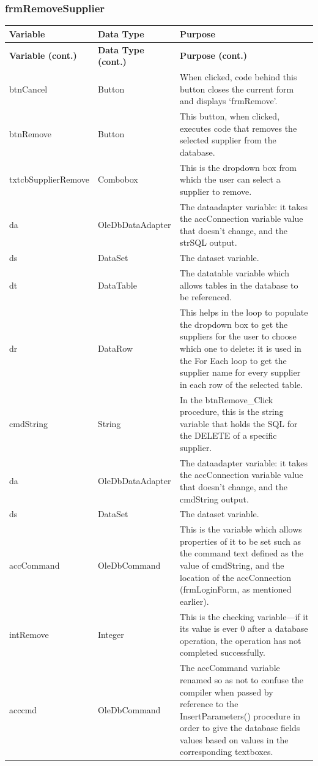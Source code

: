 	\subsubsection{frmRemoveSupplier}
	\begin{longtable}{| p{4cm} | p{3cm} | p{10cm} |}
		\hline
		\textbf{Variable} & \textbf{Data Type} & \textbf{Purpose}\\
		\endfirsthead
		\hline
		\textbf{Variable (cont.)} & \textbf{Data Type (cont.)} & \textbf{Purpose (cont.)}\\
		\endhead
		\hline
		btnCancel & Button & When clicked, code behind this button closes the current form and displays `frmRemove'.\\
		\hline
		btnRemove & Button & This button, when clicked, executes code that removes the selected supplier from the database.\\
		\hline
		txtcbSupplierRemove & Combobox & This is the dropdown box from which the user can select a supplier to remove.\\
		\hline
		da & OleDbDataAdapter & The dataadapter variable: it takes the accConnection variable value that doesn't change, and the strSQL output.\\
		\hline
		ds & DataSet & The dataset variable.\\
		\hline
		dt & DataTable & The datatable variable which allows tables in the database to be referenced.\\
		\hline
		dr & DataRow & This helps in the loop to populate the dropdown box to get the suppliers for the user to choose which one to delete: it is used in the For Each loop to get the supplier name for every supplier in each row of the selected table.\\
		\hline
		cmdString & String & In the btnRemove\_Click procedure, this is the string variable that holds the SQL for the DELETE of a specific supplier.\\
		\hline
		da & OleDbDataAdapter & The dataadapter variable: it takes the accConnection variable value that doesn't change, and the cmdString output.\\
		\hline
		ds & DataSet & The dataset variable.\\
		\hline
		accCommand & OleDbCommand & This is the variable which allows properties of it to be set such as the command text defined as the value of cmdString, and the location of the accConnection (frmLoginForm, as mentioned earlier).\\
		\hline
		intRemove & Integer & This is the checking variable---if it its value is ever 0 after a database operation, the operation has not completed successfully.\\
		\hline
		acccmd & OleDbCommand & The accCommand variable renamed so as not to confuse the compiler when passed by reference to the InsertParameters() procedure in order to give the database fields values based on values in the corresponding textboxes.\\
		\hline
	\end{longtable}
	
